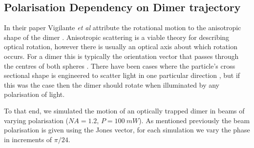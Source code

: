 \subsection{Polarisation Dependency on Dimer trajectory}
\label{sec:rot_pol}
In their paper Vigilante \textit{et al} attribute the 
rotational motion to the anisotropic shape of the dimer
\cite{Vigilante2020}. Anisotropic scattering is a viable 
theory for describing optical rotation, however there is 
usually an optical axis about which rotation occurs. For 
a dimer this is typically the orientation vector that 
passes through the centres of both spheres \cite{Ahn2018, 
Reimann2018, Bruce2020}. There have been cases where the 
particle's cross sectional shape is engineered to scatter
light in one particular direction \cite{Higurashi1994}, 
but if this was the case then the dimer should rotate 
when illuminated by any polarisation of light. 

To that end, we simulated the motion of an optically 
trapped dimer in beams of varying polarisation ($NA=1.2$, 
$P=100\ mW$). As mentioned previously the beam polarisation
is given using the Jones vector, for each simulation we vary
the phase in increments of $\pi/24$.  

